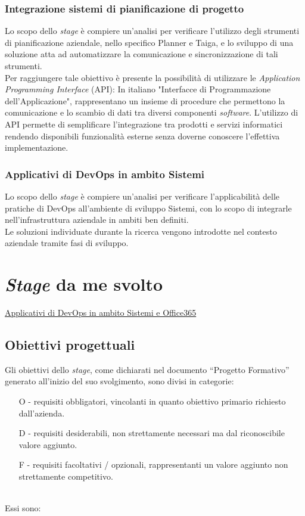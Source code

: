 \subsubsection*{Integrazione sistemi di pianificazione di progetto}
Lo scopo dello \emph{stage} è compiere un'analisi per verificare l'utilizzo degli strumenti di pianificazione aziendale, nello specifico Planner e Taiga, e lo sviluppo di una soluzione atta ad automatizzare la comunicazione e sincronizzazione di tali strumenti.\\
Per raggiungere tale obiettivo è presente la possibilità di utilizzare le \emph{Application Programming Interface} (API): In italiano "Interfacce di Programmazione dell'Applicazione", rappresentano un insieme di procedure che permettono la comunicazione e lo scambio di dati tra diversi componenti \emph{software}. L'utilizzo di API permette di semplificare l'integrazione tra prodotti e servizi informatici rendendo disponibili funzionalità esterne senza doverne conoscere l'effettiva implementazione.

\subsubsection*{Applicativi di DevOps in ambito Sistemi}
\label{stageDavide}
Lo scopo dello \emph{stage} è compiere un'analisi per verificare l'applicabilità delle pratiche di \gls{DevOps} all'ambiente di sviluppo \gls{Sistemi}, con lo scopo di integrarle nell'infrastruttura aziendale in ambiti ben definiti.\\
Le soluzioni individuate durante la ricerca vengono introdotte nel contesto aziendale tramite fasi di sviluppo. 


\section{\emph{Stage} da me svolto}
\hyperref[mioStage]{Applicativi di DevOps in ambito Sistemi e Office365}
\subsection{Obiettivi progettuali}
Gli obiettivi dello \emph{stage}, come dichiarati nel documento “Progetto Formativo” generato all'inizio del suo svolgimento, sono divisi in categorie:
\begin{enumerate}
	\item[O -]requisiti obbligatori, vincolanti in quanto obiettivo primario richiesto dall'azienda.
    \item[D -]requisiti desiderabili, non strettamente necessari ma dal riconoscibile valore aggiunto.
    \item[F -]requisiti facoltativi / opzionali, rappresentanti un valore aggiunto non strettamente competitivo.\\\\
\end{enumerate}
Essi sono:

